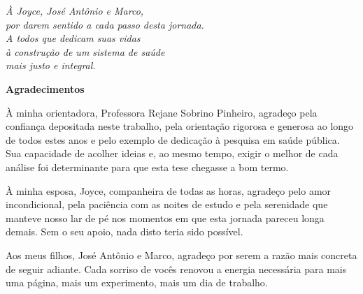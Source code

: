 \documentclass[12pt,a4paper,openany]{book}
\begin{document}




\newpage

\thispagestyle{empty}

\vspace*{\fill}

\begin{flushright}
\textit{À Joyce, José Antônio e Marco,\\
por darem sentido a cada passo desta jornada.\\[6pt]
A todos que dedicam suas vidas\\
à construção de um sistema de saúde\\
mais justo e integral.}
\end{flushright}





\newpage

\noindent

\vspace*{20pt}

\begin{center}

{\LARGE\bf Agradecimentos}

\end{center}

\vspace*{40pt}

À minha orientadora, Professora Rejane Sobrino Pinheiro, agradeço pela
confiança depositada neste trabalho, pela orientação rigorosa e generosa ao
longo de todos estes anos e pelo exemplo de dedicação à pesquisa em saúde
pública. Sua capacidade de acolher ideias e, ao mesmo tempo, exigir o melhor
de cada análise foi determinante para que esta tese chegasse a bom termo.

À minha esposa, Joyce, companheira de todas as horas, agradeço pelo amor
incondicional, pela paciência com as noites de estudo e pela serenidade que
manteve nosso lar de pé nos momentos em que esta jornada pareceu longa
demais. Sem o seu apoio, nada disto teria sido possível.

Aos meus filhos, José Antônio e Marco, agradeço por serem a razão mais
concreta de seguir adiante. Cada sorriso de vocês renovou a energia
necessária para mais uma página, mais um experimento, mais um dia de
trabalho.
\end{document}
